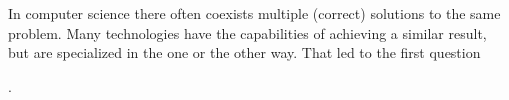 In computer science there often coexists multiple (correct) solutions to the same problem.
Many technologies have the capabilities of achieving a similar result, but are specialized in the one or the other way.
That led to the first question


.



%
%
%

